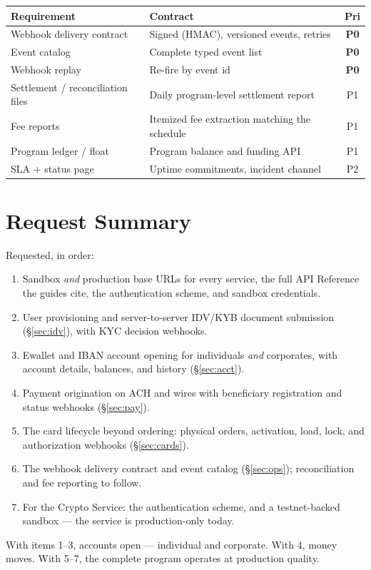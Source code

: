 \documentclass[11pt]{article}
\newcommand{\pri}[1]{\textbf{#1}}
\begin{document}
\begin{table}[H]
\centering
\small
\begin{tabular}{@{}p{5.4cm}p{7.2cm}c@{}}
\toprule
\textbf{Requirement} & \textbf{Contract} & \textbf{Pri} \\
\midrule
Webhook delivery contract & Signed (HMAC), versioned events, retries & \pri{P0} \\
Event catalog & Complete typed event list & \pri{P0} \\
Webhook replay & Re-fire by event id & \pri{P0} \\
Settlement / reconciliation files & Daily program-level settlement report & P1 \\
Fee reports & Itemized fee extraction matching the schedule & P1 \\
Program ledger / float & Program balance and funding API & P1 \\
SLA + status page & Uptime commitments, incident channel & P2 \\
\bottomrule
\end{tabular}
\end{table}

\section{Request Summary}

Requested, in order:

\begin{enumerate}
\item Sandbox \emph{and} production base URLs for every service, the full API Reference the guides cite, the authentication scheme, and sandbox credentials.
\item User provisioning and server-to-server IDV/KYB document submission (\S\ref{sec:idv}), with KYC decision webhooks.
\item Ewallet and IBAN account opening for individuals \emph{and} corporates, with account details, balances, and history (\S\ref{sec:acct}).
\item Payment origination on ACH and wires with beneficiary registration and status webhooks (\S\ref{sec:pay}).
\item The card lifecycle beyond ordering: physical orders, activation, load, lock, and authorization webhooks (\S\ref{sec:cards}).
\item The webhook delivery contract and event catalog (\S\ref{sec:ops}); reconciliation and fee reporting to follow.
\item For the Crypto Service: the authentication scheme, and a testnet-backed sandbox --- the service is production-only today.
\end{enumerate}

With items 1--3, accounts open --- individual and corporate. With 4, money moves. With 5--7, the complete program operates at production quality.
\end{document}
